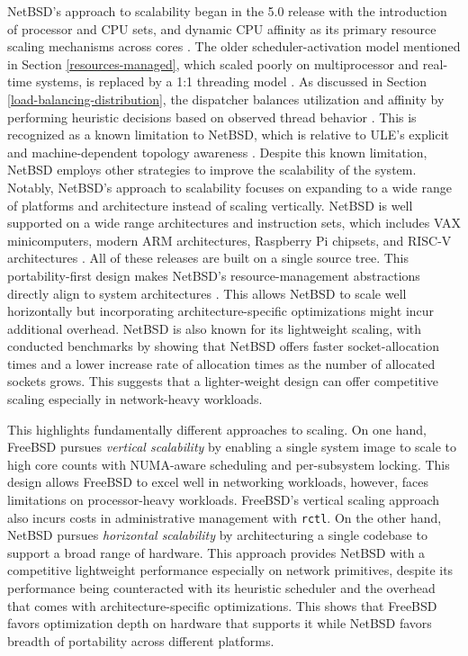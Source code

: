 NetBSD's approach to scalability began in the 5.0 release with the introduction of processor and CPU sets, and dynamic CPU
affinity as its primary resource scaling mechanisms across cores \parencite{netbsd_5_0}. The older scheduler-activation
model mentioned in Section \ref{resources-managed}, which scaled poorly on multiprocessor and real-time systems,
is replaced by a 1:1 threading model \parencite{williams_scheduler}. As discussed in Section \ref{load-balancing-distribution}, the
dispatcher balances utilization and affinity by performing heuristic decisions based on observed thread behavior
\parencite{rasiukevicius2009}. This is recognized as a known limitation to NetBSD, which is relative to ULE's explicit and
machine-dependent topology awareness \parencite{rasiukevicius2009}. Despite this known limitation, NetBSD employs other
strategies to improve the scalability of the system. Notably, NetBSD's approach to scalability focuses on expanding to a
wide range of platforms and architecture instead of scaling vertically. NetBSD is well supported on a wide range
architectures and instruction sets, which includes VAX minicomputers, modern ARM architectures, Raspberry Pi chipsets,
and RISC-V architectures \parencite{netbsd_portability}. All of these releases are built on a single source tree. This
portability-first design makes NetBSD's resource-management abstractions directly align to system architectures
\parencite{netbsd_portability}. This allows NetBSD to scale well horizontally but incorporating architecture-specific
optimizations might incur additional overhead. NetBSD is also known for its lightweight scaling, with conducted benchmarks
by \textcite{gmcgarry} showing that NetBSD offers faster socket-allocation times and a lower increase rate of allocation
times as the number of allocated sockets grows. This suggests that a lighter-weight design can offer competitive scaling
especially in network-heavy workloads.

This highlights fundamentally different approaches to scaling. On one hand, FreeBSD pursues \textit{vertical scalability}
by enabling a single system image to scale to high core counts with NUMA-aware scheduling and per-subsystem locking.
This design allows FreeBSD to excel well in networking workloads, however, faces limitations on processor-heavy workloads.
FreeBSD's vertical scaling approach also incurs costs in administrative management with \texttt{rctl}. On the other hand,
NetBSD pursues \textit{horizontal scalability} by architecturing a single codebase to support a broad range of hardware.
This approach provides NetBSD with a competitive lightweight performance especially on network primitives, despite its
performance being counteracted with its heuristic scheduler and the overhead that comes with architecture-specific
optimizations. This shows that FreeBSD favors optimization depth on hardware that supports it while NetBSD favors
breadth of portability across different platforms.

